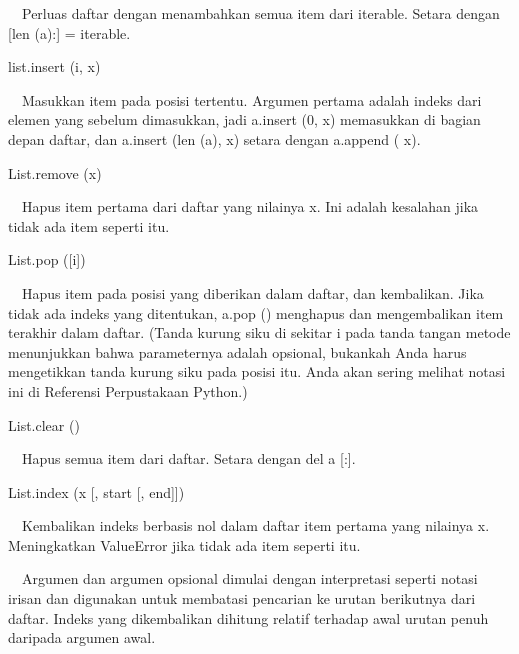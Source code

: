 \documentclass[a4paper,12pt]{report}
\begin{document}
\vspace{12pt}
\noindent 
 $  $ $  $ $  $ $  $Perluas daftar dengan menambahkan semua item dari iterable. Setara dengan [len (a):] = iterable. \par
\vspace{12pt}
\noindent 
list.insert (i, x) \par
\vspace{12pt}
\noindent 
 $  $ $  $ $  $ $  $Masukkan item pada posisi tertentu. Argumen pertama adalah indeks dari elemen yang sebelum dimasukkan, jadi a.insert (0, x) memasukkan di bagian depan daftar, dan a.insert (len (a), x) setara dengan a.append ( x). \par
\vspace{12pt}
\noindent 
List.remove (x) \par
\vspace{12pt}
\noindent 
 $  $ $  $ $  $ $  $Hapus item pertama dari daftar yang nilainya x. Ini adalah kesalahan jika tidak ada item seperti itu. \par
\vspace{12pt}
\noindent 
List.pop ([i]) \par
\vspace{12pt}
\noindent 
 $  $ $  $ $  $ $  $Hapus item pada posisi yang diberikan dalam daftar, dan kembalikan. Jika tidak ada indeks yang ditentukan, a.pop () menghapus dan mengembalikan item terakhir dalam daftar. (Tanda kurung siku di sekitar i pada tanda tangan metode menunjukkan bahwa parameternya adalah opsional, bukankah Anda harus mengetikkan tanda kurung siku pada posisi itu. Anda akan sering melihat notasi ini di Referensi Perpustakaan Python.) \par
\vspace{12pt}
\noindent 
List.clear () \par
\vspace{12pt}
\noindent 
 $  $ $  $ $  $ $  $Hapus semua item dari daftar. Setara dengan del a [:]. \par
\vspace{12pt}
\noindent 
List.index (x [, start [, end]]) \par
\vspace{12pt}
\noindent 
 $  $ $  $ $  $ $  $Kembalikan indeks berbasis nol dalam daftar item pertama yang nilainya x. Meningkatkan ValueError jika tidak ada item seperti itu. \par
\vspace{12pt}
\noindent 
 $  $ $  $ $  $ $  $Argumen dan argumen opsional dimulai dengan interpretasi seperti notasi irisan dan digunakan untuk membatasi pencarian ke urutan berikutnya dari daftar. Indeks yang dikembalikan dihitung relatif terhadap awal urutan penuh daripada argumen awal. \par
\end{document}
